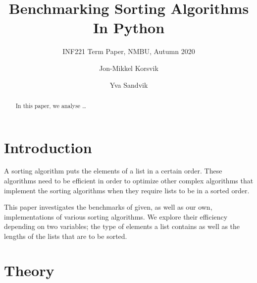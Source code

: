 \documentclass[sigconf, nonacm, natbib, screen, balance=False]{acmart}
\begin{document}
\title{Benchmarking Sorting Algorithms In Python}
\subtitle{INF221 Term Paper, NMBU, Autumn 2020}

\author{Jon-Mikkel Korsvik}
\affiliation{}  %

\author{Yva Sandvik}

\begin{abstract}
  In this paper, we analyse \dots 
\end{abstract}


\maketitle

\section{Introduction}\label{sec:intro}

A sorting algorithm puts the elements of a list in a certain order. These algorithms need to be efficient in order to optimize other complex algorithms that implement the sorting algorithms when they require lists to be in a sorted order. 

This paper investigates the benchmarks of given, as well as our own, implementations of various sorting algorithms. We explore their efficiency depending on two variables; the type of elements a list contains as well as the lengths of the lists that are to be sorted.  

\section{Theory}\label{sec:theory}
\end{document}
